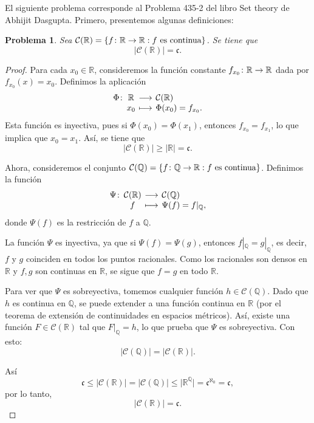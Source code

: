 \documentclass[a4,10pt]{aleph-notas}
\newtheorem*{prob}{Problema}
\begin{document}
\encabezado

\noindent
El siguiente problema corresponde al Problema 435-2 del libro Set theory de Abhijit Dasgupta. Primero, presentemos algunas definiciones:


\begin{prob}
    Sea $\mathcal{C}(\mathbb{R}) = \{ f\colon \mathbb{R} \rightarrow \mathbb{R} : f\text{ es continua} \}$. Se tiene que
    \[
        \big|\mathcal{C}(\mathbb{R})\big| = \mathfrak{c}.
    \]
\end{prob}

\begin{proof}
    Para cada $x_0 \in \mathbb{R}$, consideremos la función constante $f_{x_0}\colon \mathbb{R} \rightarrow \mathbb{R}$ dada por
    $
        f_{x_0}(x) = x_0.
    $
    Definimos la aplicación
    \[
        \funcion{\Phi}{\mathbb{R}}{\mathcal{C}(\mathbb{R})}{x_0}{\Phi(x_0) = f_{x_0}.}
    \]
    Esta función es inyectiva, pues si $\Phi(x_0) = \Phi(x_1)$, entonces $f_{x_0} = f_{x_1}$, lo que implica que $x_0 = x_1$. Así, se tiene que
    \[
        \big|\mathcal{C}(\mathbb{R})\big| \geq |\mathbb{R}| = \mathfrak{c}.
    \]

    Ahora, consideremos el conjunto $\mathcal{C}(\mathbb{Q}) = \{ f\colon \mathbb{Q} \rightarrow \mathbb{R} : f \text{ es continua} \}$. Definimos la función
    \[
        \funcion{\Psi}{\mathcal{C}(\mathbb{R})}{\mathcal{C}(\mathbb{Q})}{f}{\Psi(f) = f|_{\mathbb{Q}},}
    \]
    donde $\Psi(f)$ es la restricción de $f$ a $\mathbb{Q}$. 

    La función $\Psi$ es inyectiva, ya que si $\Psi(f) = \Psi(g)$, entonces $f|_{\mathbb{Q}} = g|_{\mathbb{Q}}$, es decir, $f$ y $g$ coinciden en todos los puntos racionales. Como los racionales son densos en $\mathbb{R}$ y $f, g$ son continuas en $\mathbb{R}$, se sigue que $f = g$ en todo $\mathbb{R}$. 

    Para ver que $\Psi$ es sobreyectiva, tomemos cualquier función $h \in \mathcal{C}(\mathbb{Q})$. Dado que $h$ es continua en $\mathbb{Q}$, se puede extender a una función continua en $\mathbb{R}$ (por el teorema de extensión de continuidades en espacios métricos). Así, existe una función $F \in \mathcal{C}(\mathbb{R})$ tal que $F|_{\mathbb{Q}} = h$, lo que prueba que $\Psi$ es sobreyectiva. Con esto:
    \[
        \big|\mathcal{C}(\mathbb{Q})\big| = \big|\mathcal{C}(\mathbb{R})\big|.
    \]

    Así
    \[
        \mathfrak{c}
        \leq \big|\mathcal{C}(\mathbb{R})\big| 
        = \big|\mathcal{C}(\mathbb{Q})\big|
        \leq \big|\mathbb{R}^{\mathbb{Q}}\big| 
        = \mathfrak{c}^{\aleph_0} = \mathfrak{c},
    \]
    por lo tanto,
    \[
        \big|\mathcal{C}(\mathbb{R})\big| = \mathfrak{c}.
    \]
\end{proof}


    
\end{document}
